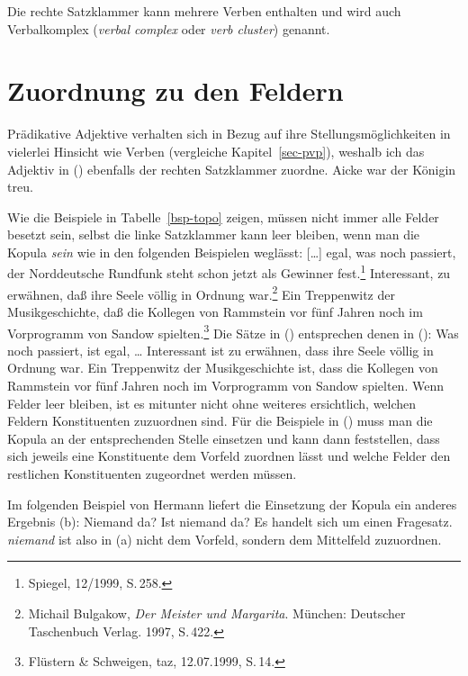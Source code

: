 Die rechte Satzklammer kann mehrere Verben enthalten und wird auch 
Verbalkomplex (\emph{verbal complex} oder \emph{verb cluster}) genannt.

\section{Zuordnung zu den Feldern}

Prädikative Adjektive verhalten sich in Bezug auf ihre Stellungsmöglichkeiten in vielerlei Hinsicht
wie Verben (vergleiche Kapitel~\ref{sec-pvp}), weshalb ich das Adjektiv in () ebenfalls der
rechten Satzklammer zuordne.
\ea
Aicke war der Königin treu.
\z

\noindent
Wie die Beispiele in Tabelle~\ref{bsp-topo} zeigen, müssen nicht immer
alle Felder besetzt sein, selbst die linke Satzklammer kann leer bleiben,
wenn man die Kopula \emph{sein} wie in den folgenden Beispielen weglässt:
\eal
\ex
{}[\ldots]
egal,      was  noch  passiert, der Norddeutsche Rundfunk             steht  schon   jetzt als Gewinner fest.\footnote{
        Spiegel, 12/1999, S.\,258.
}
\ex Interessant, zu erwähnen, daß ihre Seele völlig    in Ordnung war.\footnote{
        Michail Bulgakow, \emph{Der Meister und Margarita}. München: Deutscher Taschenbuch Verlag. 1997, S.\,422.
      }
\ex
Ein Treppenwitz der    Musikgeschichte, daß die Kollegen   von Rammstein vor    fünf Jahren noch im      Vorprogramm   von Sandow spielten.\footnote{
         Flüstern \& Schweigen, taz, 12.07.1999, S.\,14. %
}
\zl
Die Sätze in () entsprechen denen in ():
\eal
\ex 
Was noch passiert, ist egal, \ldots
\ex
Interessant ist zu erwähnen, dass ihre Seele völlig in Ordnung war.
\ex 
Ein Treppenwitz der Musikgeschichte ist, dass die Kollegen von Rammstein vor fünf Jahren noch im Vorprogramm von Sandow spielten.
\zl
Wenn Felder leer bleiben, ist es mitunter nicht ohne weiteres
ersichtlich, welchen Feldern Konstituenten zuzuordnen sind.
Für die Beispiele in () muss man die Kopula an der entsprechenden Stelle einsetzen und kann
dann feststellen, dass sich jeweils eine Konstituente dem Vorfeld zuordnen lässt und welche Felder
den restlichen Konstituenten zugeordnet werden müssen.

Im folgenden Beispiel von Hermann \citet[]{Paul1919a} liefert die Einsetzung der Kopula
ein anderes Ergebnis (b):
\eal
\ex Niemand da?
\ex Ist niemand da?
\zl
Es handelt sich um einen Fragesatz. \emph{niemand} ist also in (a)
nicht dem Vorfeld, sondern dem Mittelfeld zuzuordnen.

